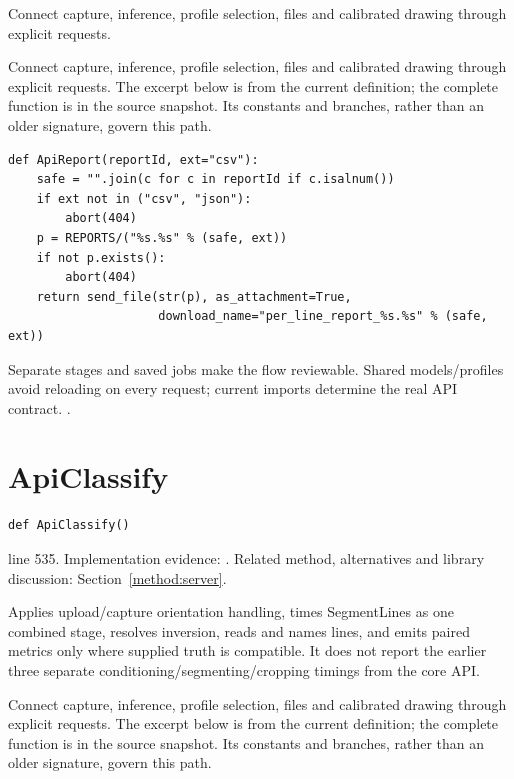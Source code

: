 Connect capture, inference, profile selection, files and calibrated drawing through explicit requests.


Connect capture, inference, profile selection, files and calibrated drawing through explicit requests. The excerpt below is from the current definition; the complete function is in the source snapshot. Its constants and branches, rather than an older signature, govern this path.


\begin{lstlisting}[style=plain]
def ApiReport(reportId, ext="csv"):
    safe = "".join(c for c in reportId if c.isalnum())
    if ext not in ("csv", "json"):
        abort(404)
    p = REPORTS/("%s.%s" % (safe, ext))
    if not p.exists():
        abort(404)
    return send_file(str(p), as_attachment=True,
                     download_name="per_line_report_%s.%s" % (safe, ext))
\end{lstlisting}
Separate stages and saved jobs make the flow reviewable. Shared models/profiles avoid reloading on every request; current imports determine the real API contract. \cite{flaskdocs,pillowops,code2026}.


\section{ApiClassify}\label{fn:web-server:ApiClassify}
\begin{lstlisting}[style=sig]
def ApiClassify()
\end{lstlisting}
 line 535. Implementation evidence: \cite{code2026}. Related method, alternatives and library discussion: Section~\ref{method:server}.


Applies upload/capture orientation handling, times SegmentLines as one combined stage, resolves inversion, reads and names lines, and emits paired metrics only where supplied truth is compatible. It does not report the earlier three separate conditioning/segmenting/cropping timings from the core API.


Connect capture, inference, profile selection, files and calibrated drawing through explicit requests. The excerpt below is from the current definition; the complete function is in the source snapshot. Its constants and branches, rather than an older signature, govern this path.


